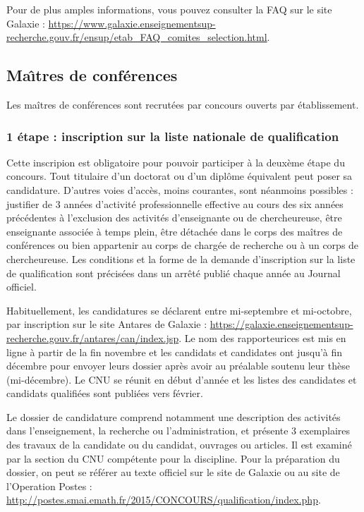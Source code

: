 Pour de plus amples informations, vous pouvez consulter la FAQ sur le site Galaxie : \url{https://www.galaxie.enseignementsup-recherche.gouv.fr/ensup/etab_FAQ_comites_selection.html}.

\subsection{Ma\^\i tres de conf\'erences}

Les ma\^itres de conf\'erences sont recrut\'e\mp e\mp s par concours ouverts par \'etablissement.

\subsubsection*{1\iere{} \'etape : inscription sur la liste nationale de qualification}

Cette inscripion est obligatoire pour pouvoir participer \`a la
deux\`eme \'etape du concours. Tout titulaire d'un doctorat ou d'un
dipl\^ome \'equivalent peut poser sa candidature. D'autres voies
d'acc\`es, moins courantes, sont n\'eanmoins possibles : justifier de
3 ann\'ees d'activit\'e professionnelle effective au cours des six
ann\'ees pr\'ec\'edentes \`a l'exclusion des activit\'es
d'enseignant\mp e ou de chercheur\mp euse, \^etre enseignant\mp e associ\'e\mp e \`a temps
plein, \^etre d\'etach\'e\mp e dans le corps des ma\^itres de
conf\'erences ou bien appartenir au corps de charg\'e\mp e de recherche
ou \`a un corps de chercheur\mp euse. Les conditions et la forme de la
demande d'inscription sur la liste de qualification sont
pr\'ecis\'ees dans un arr\^et\'e publi\'e chaque ann\'ee au Journal
officiel.

Habituellement, les candidatures se d\'eclarent entre mi-septembre et mi-octobre, 
par inscription sur le site Antares de Galaxie : \url{https://galaxie.enseignementsup-recherche.gouv.fr/antares/can/index.jsp}.
Le nom des rapporteur\mp ice\mp s est mis en ligne \`a partir de la fin novembre et 
les candidats et candidates ont jusqu'\`a fin d\'ecembre pour envoyer leurs dossier apr\`es avoir au pr\'ealable soutenu
leur th\`ese (mi-d\'ecembre).
Le CNU se r\'eunit en d\'ebut d'ann\'ee et les listes des candidates et candidats qualifi\'e\mp e\mp s sont publi\'ees vers f\'evrier.

Le dossier de candidature comprend notamment une
description des activit\'es dans l'enseignement, la recherche ou
l'administration, et pr\'esente 3 exemplaires des travaux de la candidate ou du candidat,
ouvrages ou articles. Il est examin\'e par la section du CNU
comp\'etente pour la discipline. Pour la pr\'eparation du dossier, on peut se r\'ef\'erer au texte officiel sur le site de Galaxie
ou au site de l'Operation Postes : \url{http://postes.smai.emath.fr/2015/CONCOURS/qualification/index.php}.

